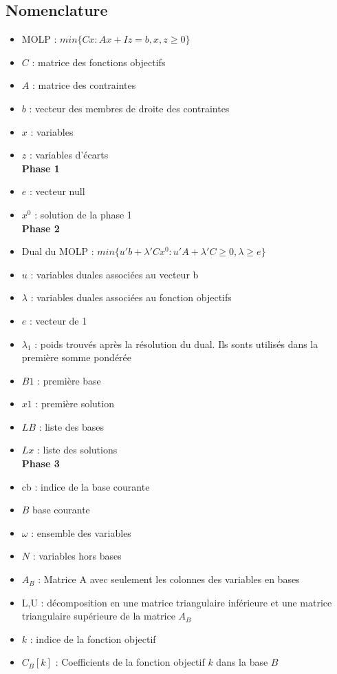 \documentclass[a4paper,10pt]{article}
\theoremstyle{plain}
\begin{document}
\subsection*{Nomenclature}
\begin{itemize}
\item MOLP : $ min \{ Cx : Ax + Iz = b,x,z \geq 0 \} $
\item $C$ : matrice des fonctions objectifs
\item $A$ : matrice des contraintes
\item $b$ : vecteur des membres de droite des contraintes
\item $x$ : variables
\item $z$ : variables d'écarts\\
  \textbf{Phase 1}
\item $e$ : vecteur null
\item $x^0$ : solution de la phase 1\\
  \textbf{Phase 2}
\item Dual du MOLP : $min \{ u'b + \lambda'Cx^0 : u'A + \lambda'C \geq 0,\lambda \geq e \} $
\item $u$ : variables duales associées au vecteur b
\item $\lambda$ : variables duales associées au fonction objectifs
\item $e$ : vecteur de 1
\item $\lambda_1$ : poids trouvés après la résolution du dual. Ils sonts utilisés dans la première somme pondérée
\item $B1$ : première base
\item $x1$ : première solution
\item $LB$ : liste des bases
\item $Lx$ : liste des solutions\\
  \textbf{Phase 3}
\item cb : indice de la base courante
\item $B$ base courante
\item $\omega$ : ensemble des variables
\item $N$ : variables hors bases
\item $A_B$ : Matrice A avec seulement les colonnes des variables en bases
\item L,U : décomposition en une matrice triangulaire inférieure et une matrice triangulaire supérieure de la matrice $A_B$
\item $k$ : indice de la fonction objectif
\item $C_B[k]$ : Coefficients de la fonction objectif $k$ dans la base $B$

\end{itemize}
\end{document}

